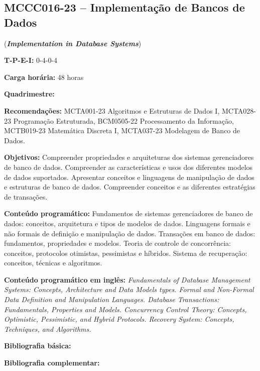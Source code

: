 \documentclass[class=article, crop=false]{standalone}
\begin{document}
\subsection*{MCCC016-23 -- Implementação de Bancos de Dados}
\label{disc:ia}

(\textbf{\textit{Implementation in Database Systems}})

\begin{center}
    \begin{minipage}{0.85\textwidth}
        \textbf{T-P-E-I:} 0-4-0-4
        
        \textbf{Carga horária:} 48 horas
        
        \textbf{Quadrimestre:}
        
        \textbf{Recomendações:}
        MCTA001-23 Algoritmos e Estruturas de Dados I,
        MCTA028-23 Programação Estruturada,
        BCM0505-22 Processamento da Informação,
        MCTB019-23 Matemática Discreta I,
        MCTA037-23 Modelagem de  Banco de Dados.
    \end{minipage}
\end{center}

\textbf{Objetivos:}
Compreender propriedades e arquiteturas dos sistemas gerenciadores de banco de
dados. 
Compreender as características e usos dos diferentes modelos de dados
suportados. 
Apresentar conceitos e linguagens de manipulação de dados e estruturas de banco
de dados. 
Compreender conceitos e as diferentes estratégias de transações. 

\textbf{Conteúdo programático:}
Fundamentos de sistemas gerenciadores de banco de dados: conceitos, arquitetura e tipos de modelos de dados.  Linguagens formais e não formais de definição e manipulação de dados. Transações em banco de dados: fundamentos, propriedades e modelos.  Teoria de controle de concorrência: conceitos, protocolos otimistas, pessimistas e híbridos.  Sistema de recuperação: conceitos, técnicas e algoritmos.

\textbf{Conteúdo programático em inglês:}
\textit{Fundamentals of Database Management Systems: Concepts, Architecture and Data Models types.  Formal and Non-Formal Data Definition and Manipulation Languages.  Database Transactions: Fundamentals, Properties and Models.  Concurrency Control Theory: Concepts, Optimistic, Pessimistic, and Hybrid Protocols.  Recovery System: Concepts, Techniques, and Algorithms.}

\newrefsection
\textbf{Bibliografia básica:}
\nocite{2005-elmasri-navathe,2015-date,SILBERSCHATZ-2003}
\printbibliography

\newrefsection
\textbf{Bibliografia complementar:}
\nocite{date-2009,sippu-2006,weikum-2001,wiese-2015,bernstein-2009}
\printbibliography
\end{document}

